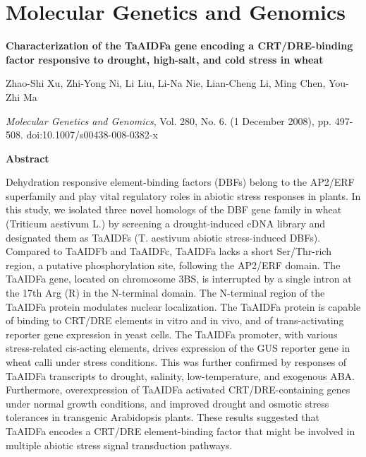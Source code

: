 \chapter{Molecular Genetics and Genomics}

{\Large \bf Characterization of the TaAIDFa gene encoding a CRT/DRE-binding factor responsive to drought, high-salt, and cold stress in wheat}

Zhao-Shi Xu, Zhi-Yong Ni, Li Liu, Li-Na Nie, Lian-Cheng Li, Ming Chen, You-Zhi Ma

{\it Molecular Genetics and Genomics}, Vol. 280, No. 6. (1 December 2008), pp. 497-508. doi:10.1007/s00438-008-0382-x

{\large \bf Abstract}

Dehydration responsive element-binding factors (DBFs) belong to the AP2/ERF superfamily and play vital regulatory roles in abiotic stress responses in plants. In this study, we isolated three novel homologs of the DBF gene family in wheat (Triticum aestivum L.) by screening a drought-induced cDNA library and designated them as TaAIDFs (T. aestivum abiotic stress-induced DBFs). Compared to TaAIDFb and TaAIDFc, TaAIDFa lacks a short Ser/Thr-rich region, a putative phosphorylation site, following the AP2/ERF domain. The TaAIDFa gene, located on chromosome 3BS, is interrupted by a single intron at the 17th Arg (R) in the N-terminal domain. The N-terminal region of the TaAIDFa protein modulates nuclear localization. The TaAIDFa protein is capable of binding to CRT/DRE elements in vitro and in vivo, and of trans-activating reporter gene expression in yeast cells. The TaAIDFa promoter, with various stress-related cis-acting elements, drives expression of the GUS reporter gene in wheat calli under stress conditions. This was further confirmed by responses of TaAIDFa transcripts to drought, salinity, low-temperature, and exogenous ABA. Furthermore, overexpression of TaAIDFa activated CRT/DRE-containing genes under normal growth conditions, and improved drought and osmotic stress tolerances in transgenic Arabidopsis plants. These results suggested that TaAIDFa encodes a CRT/DRE element-binding factor that might be involved in multiple abiotic stress signal transduction pathways.